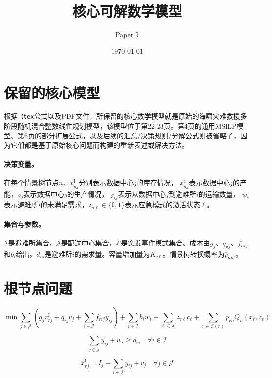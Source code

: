 \documentclass{article}
\title{核心可解数学模型}
\author{Paper 9}
\date{\today}
\begin{document}
\maketitle

\section*{保留的核心模型}
根据\texttt{【tex}公式以及PDF文件，所保留的核心数学模型就是原始的海啸灾难救援多阶段随机混合整数线性规划模型，该模型位于第22-23页。第4页的通用MSILP模型、第6页的部分扩展公式，以及后续的汇总/决策规则/分解公式则被省略了，因为它们都是基于原始核心问题而构建的重新表述或解决方法。

\paragraph{决策变量。}
在每个情景树节点$n$、$x_{nj}^{\mathrm I}$分别表示数据中心$j$的库存情况，
$x_{nj}^{\mathrm c}$表示数据中心$j$的产能，$v_j$表示数据中心$j$的生产情况，
$y_{ij}$表示从数据中心$j$到避难所$i$的运输数量，
$w_i$表示避难所$i$的未满足需求，$z_{n\ell}\in\{0,1\}$表示应急模式的激活状态$\ell$。

\paragraph{集合与参数。}
$\mathcal I$是避难所集合，$\mathcal J$是配送中心集合，$\mathcal L$是突发事件模式集合。成本由$g_j$、$q_{nj}$、$f_{nij}$和$b_i$给出。$d_{ni}$是避难所$i$的需求量。容量增加量为$K_{j\ell}$。情景树转换概率为$\bar p_{nn'}$。

\section*{根节点问题}
\begin{equation}
\min
\sum_{j \in \mathcal J}
\left(
g_j x_{rj}^{\mathrm I} + q_{rj} v_j + \sum_{i \in \mathcal I} f_{rij} y_{ij}
\right)
+
\sum_{i \in \mathcal I} b_i w_i
+
\sum_{\ell \in \mathcal L} z_{r\ell} c_\ell
+
\sum_{n \in \mathcal C(r)} \bar p_{rn} Q_n(x_r, z_r)
\tag{HDR}
\end{equation}

\begin{equation}
\sum_{j \in \mathcal J} y_{ij} + w_i \ge d_{ri}
\quad \forall i \in \mathcal I
\tag{9a}
\end{equation}

\begin{equation}
x_{rj}^{\mathrm I} = I_j - \sum_{i \in \mathcal I} y_{ij} + v_j
\quad \forall j \in \mathcal J
\tag{9b}
\end{equation}
\end{document}

